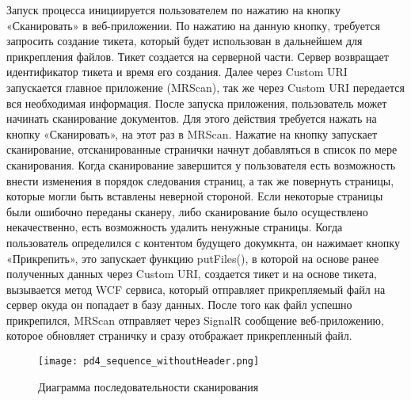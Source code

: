 Запуск процесса инициируется пользователем по нажатию на кнопку «Сканировать» в веб-приложении. По нажатию на данную кнопку, требуется запросить создание тикета, который будет использован в дальнейшем для прикрепления файлов. Тикет создается на серверной части. Сервер возвращает идентификатор тикета и время его создания. Далее через Custom URI запускается главное приложение (MRScan), так же через Custom URI передается вся необходимая информация. После запуска приложения, пользователь может начинать сканирование документов. Для этого действия требуется нажать на кнопку «Сканировать», на этот раз в MRScan. Нажатие на кнопку запускает сканирование, отсканированные странички начнут добавляться в список по мере сканирования. Когда сканирование завершится у пользователя есть возможность внести изменения в порядок следования страниц, а так же повернуть страницы, которые могли быть вставлены неверной стороной. Если некоторые страницы были ошибочно переданы сканеру, либо сканирование было осуществлено некачественно, есть возможность удалить ненужные страницы. Когда пользователь определился с контентом будущего докумкнта, он нажимает кнопку «Прикрепить», это запускает функцию putFiles(), в которой на основе ранее полученных данных через Custom URI, создается тикет и на основе тикета, вызывается метод WCF сервиса, который отправляет прикрепляемый файл на сервер окуда он попадает в базу данных. После того как файл успешно прикрепился, MRScan отправляет через SignalR сообщение веб-приложению, которое обновляет страничку и сразу отображает прикрепленный файл. 

\begin{figure}[h!]
	\centering
	\texttt{[image: pd4\_sequence\_withoutHeader.png]}
	\caption{Диаграмма последовательности сканирования}
\end{figure}